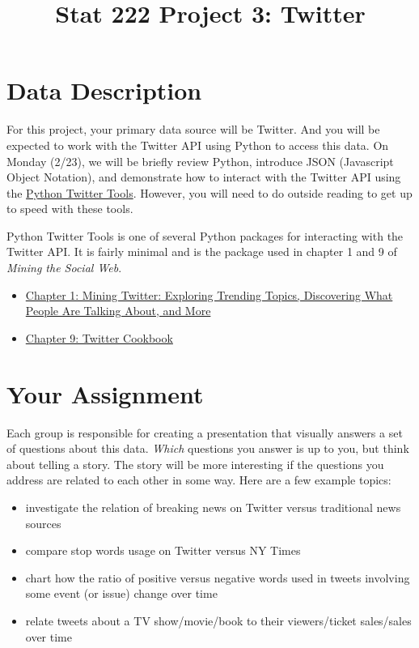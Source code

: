 \documentclass[11pt, oneside]{article}   	%
\title{Stat 222 Project 3: Twitter}
\date{}							%
\begin{document}
\maketitle

\section{Data Description}

For this project, your primary data source will be Twitter.  And you will be
expected to work with the Twitter API using Python to access this data. On
Monday (2/23), we will be briefly review Python, introduce JSON (Javascript
Object Notation), and demonstrate how to interact with the Twitter API using
the \href{https://github.com/sixohsix/twitter}{Python Twitter Tools}.  However,
you will need to do outside reading to get up to speed with these
tools. 

Python Twitter Tools is one of several Python packages for interacting with
the Twitter API.  It is fairly minimal and is the package used in
chapter 1 and 9 of \emph{Mining the Social Web}.
\begin{itemize}
\item \href{https://rawgit.com/ptwobrussell/Mining-the-Social-Web-2nd-Edition/master/ipynb/html/Chapter%201%20-%20Mining%20Twitter.html}{Chapter 1: Mining Twitter: Exploring Trending Topics, Discovering What People Are Talking About, and More}
\item \href{https://rawgit.com/ptwobrussell/Mining-the-Social-Web-2nd-Edition/master/ipynb/html/Chapter%209%20-%20Twitter%20Cookbook.html}{Chapter 9: Twitter Cookbook}
\end{itemize}



\section{Your Assignment}

Each group is responsible for creating a presentation that visually answers a set of
questions about this data. {\em Which} questions you answer is up to you, but
think about telling a story. The story will be more interesting if the
questions you address are related to each other in some way.
Here are a few example topics:
\begin{itemize}
\item investigate the relation of breaking news on Twitter versus traditional
  news sources
\item compare stop words usage on Twitter versus NY Times
\item chart how the ratio of positive versus negative words used in tweets
  involving some event (or issue) change over time
\item relate tweets about a TV show/movie/book to their viewers/ticket sales/sales
  over time
\end{itemize}
\end{document}
